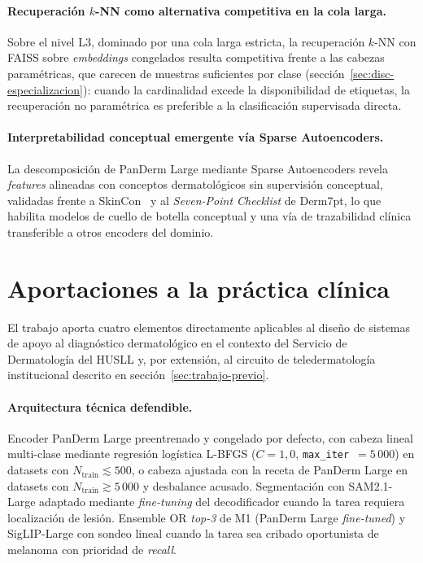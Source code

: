 \paragraph{Recuperación $k$-NN como alternativa competitiva en la
cola larga.}
Sobre el nivel L3, dominado por una cola larga estricta, la recuperación
$k$-NN con FAISS sobre \emph{embeddings} congelados resulta competitiva
frente a las cabezas paramétricas, que carecen de muestras suficientes
por clase (sección~\ref{sec:disc-especializacion}): cuando la
cardinalidad excede la disponibilidad de etiquetas, la recuperación no
paramétrica es preferible a la clasificación supervisada directa.

\paragraph{Interpretabilidad conceptual emergente vía Sparse
Autoencoders.}
La descomposición de PanDerm Large mediante Sparse Autoencoders revela
\emph{features} alineadas con conceptos dermatológicos sin supervisión
conceptual, validadas frente a SkinCon~\cite{skincon} y al
\emph{Seven-Point Checklist} de Derm7pt, lo que habilita modelos de
cuello de botella conceptual y una vía de trazabilidad clínica
transferible a otros encoders del dominio.

\section{Aportaciones a la práctica clínica}
\label{sec:aportaciones-clinicas}

El trabajo aporta cuatro elementos directamente aplicables al
diseño de sistemas de apoyo al diagnóstico dermatológico en el
contexto del Servicio de Dermatología del HUSLL y, por extensión,
al circuito de teledermatología institucional descrito en
sección~\ref{sec:trabajo-previo}.

\paragraph{Arquitectura técnica defendible.}
Encoder PanDerm Large preentrenado y congelado por defecto, con
cabeza lineal multi-clase mediante regresión logística L-BFGS
($C = 1{,}0$, \texttt{max\_iter}~$=5\,000$) en datasets con
$N_{\mathrm{train}} \lesssim 500$, o cabeza ajustada con la
receta de PanDerm Large en datasets con
$N_{\mathrm{train}} \gtrsim 5\,000$ y desbalance acusado.
Segmentación con SAM2.1-Large adaptado mediante \emph{fine-tuning}
del decodificador cuando la tarea requiera localización de lesión. Ensemble OR \emph{top-3}
de M1 (PanDerm Large \emph{fine-tuned}) y SigLIP-Large con sondeo
lineal cuando la tarea sea cribado oportunista de melanoma con
prioridad de \emph{recall}.

